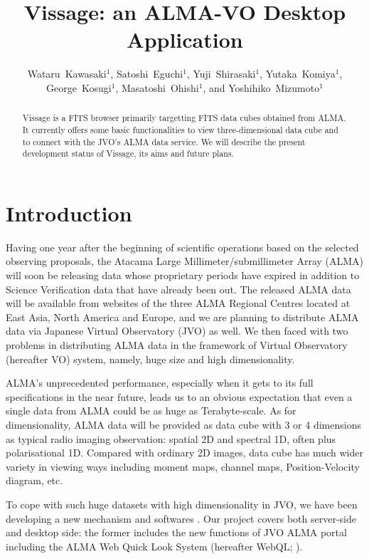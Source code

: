\documentclass[11pt,twoside]{article}
\begin{document}
\title{Vissage: an ALMA-VO Desktop Application}
\author{Wataru~Kawasaki$^1$, Satoshi~Eguchi$^1$, Yuji~Shirasaki$^1$, Yutaka~Komiya$^1$, George~Kosugi$^1$, Masatoshi~Ohishi$^1$, 
and Yoshihiko~Mizumoto$^1$
}

\begin{abstract}
Vissage is a FITS browser primarily targetting FITS data cubes obtained from 
ALMA. It currently offers some basic functionalities to view three-dimensional 
data cube and to connect with the JVO's ALMA data service. We will describe the 
present development status of Vissage, its aims and future plans.
\end{abstract}

\section{Introduction}
Having one year after the beginning of scientific operations based on the 
selected observing proposals, the Atacama Large Millimeter/submillimeter Array 
(ALMA) will soon be releasing data whose proprietary periods have expired in 
addition to Science Verification data that have already been out. 
The released ALMA data will be available from websites of the three ALMA 
Regional Centres located at East Asia, North America and Europe, and we are 
planning to distribute ALMA data via Japanese Virtual Observatory (JVO) as well. 
We then faced with two problems in distributing ALMA data in the framework of 
Virtual Observatory (hereafter VO) system, namely, huge size and high 
dimensionality. 

ALMA's unprecedented performance, especially when it gets to its full 
specifications in the near future, leads us to an obvious expectation that even 
a single data from ALMA could be as huge as Terabyte-scale. 
As for dimensionality, ALMA data will be provided as data cube with 3 or 4 
dimensions as typical radio imaging observation: spatial 2D and spectral 
1D, often plus polarisational 1D. Compared with ordinary 2D images, data cube 
has much wider variety in viewing ways including moment maps, channel maps, 
Position-Velocity diagram, etc. 

To cope with such huge datasets with high dimensionality in JVO, we have been 
developing a new mechanism and softwares \citep{O10_adassxxii, D5_adassxxii}. 
Our project covers both server-side and desktop side: the former includes the 
new functions of JVO ALMA portal including the ALMA Web Quick Look System 
(hereafter WebQL; \citet{O10_adassxxii}). 
\end{document}
